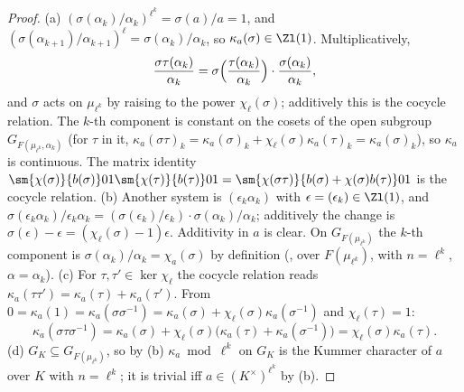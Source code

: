 \begin{proof}
(a) $(\sigma(\alpha_k)/\alpha_k)^{\ell^k}=\sigma(a)/a=1$, and $(\sigma(\alpha_{k+1})/\alpha_{k+1})^\ell=\sigma(\alpha_k)/\alpha_k$, so $\kappa_a(\sigma)\in\Zl(1)$. Multiplicatively,
\[
\frac{\sigma\tau(\alpha_k)}{\alpha_k}=\sigma\Bigl(\frac{\tau(\alpha_k)}{\alpha_k}\Bigr)\cdot\frac{\sigma(\alpha_k)}{\alpha_k},
\]
and $\sigma$ acts on $\mu_{\ell^k}$ by raising to the power $\chi_\ell(\sigma)$; additively this is the cocycle relation. The $k$-th component is constant on the cosets
of the open subgroup $G_{F(\mu_{\ell^k},\alpha_k)}$ (for $\tau$ in it, $\kappa_a(\sigma\tau)_k=\kappa_a(\sigma)_k+\chi_\ell(\sigma)\kappa_a(\tau)_k=\kappa_a(\sigma)_k$), so $\kappa_a$ is
continuous. The matrix identity $\sm{\chi(\sigma)}{b(\sigma)}01\sm{\chi(\tau)}{b(\tau)}01=\sm{\chi(\sigma\tau)}{b(\sigma)+\chi(\sigma)b(\tau)}01$ is the cocycle relation.
(b) Another system is $(\epsilon_k\alpha_k)$ with $\epsilon=(\epsilon_k)\in\Zl(1)$, and $\sigma(\epsilon_k\alpha_k)/\epsilon_k\alpha_k=(\sigma(\epsilon_k)/\epsilon_k)\cdot\sigma(\alpha_k)/
\alpha_k$; additively the change is $\sigma(\epsilon)-\epsilon=(\chi_\ell(\sigma)-1)\epsilon$. Additivity in $a$ is clear. On $G_{F(\mu_{\ell^k})}$ the $k$-th component is
$\sigma(\alpha_k)/\alpha_k=\chi_a(\sigma)$ by definition (, over $F(\mu_{\ell^k})$, with $n=\ell^k$, $\alpha=\alpha_k$).
(c) For $\tau,\tau'\in\ker\chi_\ell$ the cocycle relation reads $\kappa_a(\tau\tau')=\kappa_a(\tau)+\kappa_a(\tau')$. From $0=\kappa_a(1)=\kappa_a(\sigma\sigma^{-1})=\kappa_a(\sigma)+
\chi_\ell(\sigma)\kappa_a(\sigma^{-1})$ and $\chi_\ell(\tau)=1$:
\[
\kappa_a(\sigma\tau\sigma^{-1})=\kappa_a(\sigma)+\chi_\ell(\sigma)\bigl(\kappa_a(\tau)+\kappa_a(\sigma^{-1})\bigr)=\chi_\ell(\sigma)\kappa_a(\tau).
\]
(d) $G_K\subseteq G_{F(\mu_{\ell^k})}$, so by (b) $\kappa_a\bmod\ell^k$ on $G_K$ is the Kummer character of $a$ over $K$ with $n=\ell^k$; it is trivial iff $a\in(K^\times)^{\ell^k}$
by (b).
\end{proof}

